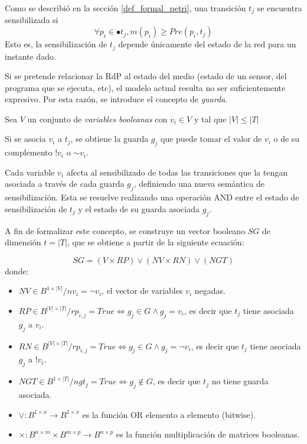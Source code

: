 
Como se describió en la sección \ref{def_formal_petri}, una transición $t_{j}$
se encuentra sensibilizada si $$ \forall p_{i} \in \bullet t_{j}, m(p_i) \geq Pre(p_{i}, t_{j}) $$
Esto es, la sensibilización de $t_{j}$ depende únicamente del estado de
la red para un instante dado.

Si se pretende relacionar la RdP al estado del medio (estado de un sensor, del
programa que se ejecuta, etc), el modelo actual resulta no ser suficientemente
expresivo. Por esta razón, se introduce el concepto de \textit{guarda}.

Sea $V$ un conjunto de \textit{variables booleanas} con $v_{i} \in V$ y tal que
$\left\vert V \right\vert \leq \left\vert T \right\vert$

Si se asocia $v_{i}$ a $t_{j}$, se obtiene la guarda $g_{j}$ que puede tomar el
valor de $v_{i}$ o de su complemento $!v_{i}$ o $\mathtt{\sim} v_{i}$.

Cada variable $v_{i}$ afecta al sensibilizado de todas las transiciones que la
tengan asociada a través de cada guarda $g_{j}$, definiendo una nueva semántica
de sensibilización. Esta se resuelve realizando una operación AND entre el
estado de sensibilización de $t_{j}$ y el estado de su guarda asociada $g_{j}$.

A fin de formalizar este concepto, se construye un vector booleano $SG$ de
dimensión $t = \left\vert{T}\right\vert$, que se obtiene a partir de la
siguiente ecuación:

$$ SG = (V \times RP) \vee ( NV \times RN) \vee (NGT) $$
donde:
\begin{itemize}
  \item $NV \in B^{1 \times \left\vert V \right\vert} \slash  nv_{i} = \neg
  v_{i}$, el vector de variables $v_{i}$ negadas.
  \item $RP \in B^{\left\vert V \right\vert \times \left\vert T 
  \right\vert} \slash rp_{i,j} = True \Leftrightarrow g_{j} \in G \land g_{j} =
  v_{i} $, es decir que $t_{j}$ tiene asociada $g_{j}$ a $v_{i}$.
  \item $RN \in B^{\left\vert V \right\vert \times \left\vert T 
  \right\vert} \slash rp_{i,j} = True \Leftrightarrow g_{j} \in G \land g_{j} =
  \neg v_{i} $, es decir que $t_{j}$ tiene asociada $g_{j}$ a $!v_{i}$.
  \item $NGT \in B^{1 \times \left\vert T \right\vert} \slash ngt_{j} = True
  \Leftrightarrow g_{j} \not \in G$, es decir que $t_{j}$ no tiene guarda
  asociada.
  \item $\vee: B^{1 \times x} \rightarrow B^{1 \times x}$ es la
  función OR elemento a elemento (bitwise).
  \item $\times: B^{n \times m} \times B^{m \times p} \rightarrow B^{n \times
  p}$ es la función multiplicación de matrices booleanas.
\end{itemize}

